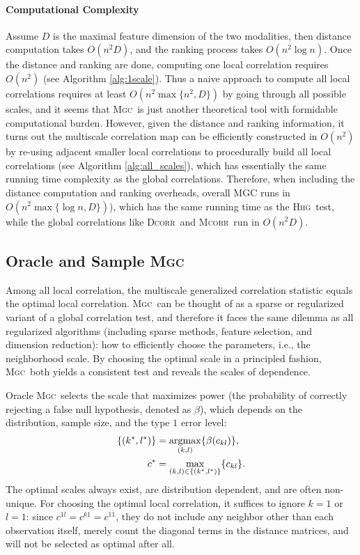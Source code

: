 \documentclass[11pt]{article}
\providecommand{\sct}[1]{{\normalfont\textsc{#1}}}
\newcommand{\GG}{c}
\newcommand{\Mgc}{\sct{Mgc}}
\newcommand{\Hhg}{\sct{Hhg}}
\newcommand{\Dcorr}{\sct{Dcorr}}
\newcommand{\Mcorr}{\sct{Mcorr}}
\newcommand{\argmax}{\operatornamewithlimits{argmax}}
\begin{document}
\paragraph{Computational Complexity}

Assume $D$ is the maximal feature dimension of the two modalities, then distance computation takes $O(n^2 D)$, and the ranking process takes $O(n^2 \log n)$. Once the distance and ranking are done, computing one local correlation requires $O(n^2)$ (see Algorithm \ref{alg:1scale}). Thus a naive approach to compute all local correlations requires at least $O(n^2 \max\{n^2, D\})$ by going through all possible scales, and it seems that \Mgc~is just another theoretical tool with formidable computational burden. However, given the distance and ranking information, it turns out the multiscale correlation map can be efficiently constructed in $O(n^2)$ by re-using adjacent smaller local correlations to procedurally build all local correlations (see Algorithm \ref{alg:all_scales}), which has essentially the same running time complexity as the global correlations. Therefore, when including the distance computation and ranking overheads, overall MGC runs in $O(n^2 \max\{\log n,D\})$), which has the same running time as the \Hhg~test, while the global correlations like \Dcorr~and \Mcorr~run in $O(n^2D)$.

\subsection{Oracle and Sample \Mgc}
\label{appen:mgc2}
Among all local correlation, the multiscale generalized correlation statistic equals the optimal local correlation. \Mgc~can be thought of as a sparse or regularized variant of a global correlation test, and therefore it faces the same dilemma as all regularized algorithms (including sparse methods, feature selection, and dimension reduction): how to efficiently choose the parameters, i.e., the neighborhood scale. By choosing the optimal scale in a principled fashion, \Mgc~both yields a consistent test and reveals the scales of dependence.  

Oracle \Mgc~selects the scale that maximizes power (the probability of correctly rejecting a false null hypothesis, denoted as $\beta$), which depends on the distribution, sample size, and the type $1$ error level:
\begin{align*}
\{(k^{*},l^{*})\} &=\argmax_{(k,l)}\{\beta(\GG_{kl})\}, \\
\GG^{*} &=\max_{(k,l) \in \{(k^{*},l^{*})\}} \{\GG_{kl}\}. 
\end{align*}
The optimal scales always exist,  are distribution dependent, and are often non-unique. For choosing the optimal local correlation, it suffices to ignore $k=1$ or $l=1$: since $\GG^{1l}=\GG^{k1}=\GG^{11}$, they do not include any neighbor other than each observation itself, merely count the diagonal terms in the distance matrices, and will not be selected as optimal after all.
\end{document}

